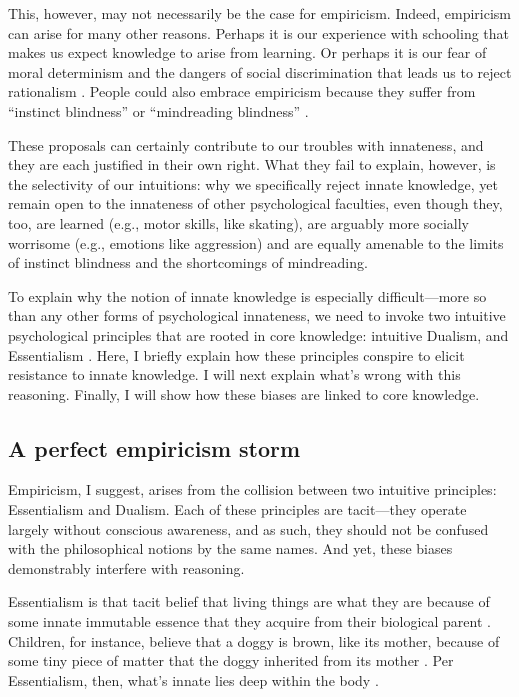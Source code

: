 \documentclass[output=paper,colorlinks,citecolor=brown
]{langscibook}
\begin{document}
This, however, may not necessarily be the case for empiricism. Indeed, empiricism can arise for many other reasons. Perhaps it is our experience with schooling that makes us expect knowledge to arise from learning. Or perhaps it is our fear of moral determinism and the dangers of social discrimination that leads us to reject rationalism \citep{pinker2004blank}. People could also embrace empiricism because they suffer from “instinct blindness” \citep{cosmides1994origins} or “mindreading blindness” \citep{carruthers2020mindreading}.

These proposals can certainly contribute to our troubles with innateness, and they are each justified in their own right. What they fail to explain, however, is the selectivity of our intuitions: why we specifically reject innate knowledge, yet remain open to the innateness of other psychological faculties, even though they, too, are learned (e.g., motor skills, like skating), are arguably more socially worrisome (e.g., emotions like aggression) and are equally amenable to the limits of instinct blindness and the shortcomings of mindreading.  

To explain why the notion of innate knowledge is especially difficult—more so than any other forms of psychological innateness, we need to invoke two intuitive psychological principles that are rooted in core knowledge: intuitive Dualism, and Essentialism \citep{berent2020blind,berent2021canwe}. Here, I briefly explain how these principles conspire to elicit resistance to innate knowledge. I will next explain what’s wrong with this reasoning. Finally, I will show how these biases are linked to core knowledge.

\subsection{A perfect empiricism storm}
Empiricism, I suggest, arises from the collision between two intuitive principles: Essentialism and Dualism. Each of these principles are tacit—they operate largely without conscious awareness, and as such, they should not be confused with the philosophical notions by the same names. And yet, these biases demonstrably interfere with reasoning.

Essentialism is that tacit belief that living things are what they are because of some innate immutable essence that they acquire from their biological parent \citep{keil1986acquisition,gelman2003essential}. Children, for instance, believe that a doggy is brown, like its mother, because of some tiny piece of matter that the doggy inherited from its mother \cite{springer1991early}. Per Essentialism, then, what’s innate lies deep within the body \citep{springer1991early}.
\end{document}
